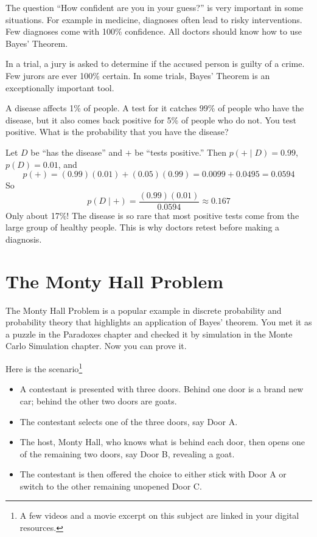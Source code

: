 The question ``How confident are you in your guess?'' is very
important in some situations. For example in medicine, diagnoses often
lead to risky interventions. Few diagnoses come with 100\% confidence.
All doctors should know how to use Bayes' Theorem. 

In a trial, a jury is asked to determine if the accused person is
guilty of a crime. Few jurors are ever 100\% certain. In some trials, Bayes'
Theorem is an exceptionally important tool.

\begin{Exercise}[label=bayes2, title=A Positive Test]
A disease affects 1\% of people. A test for it catches 99\% of people who
have the disease, but it also comes back positive for 5\% of people who do
not. You test positive. What is the probability that you have the
disease?
\end{Exercise}
\begin{Answer}[ref=bayes2]
Let $D$ be ``has the disease'' and $+$ be ``tests positive.'' Then
$p(+ \mid D) = 0.99$, $p(D) = 0.01$, and
$$p(+) = (0.99)(0.01) + (0.05)(0.99) = 0.0099 + 0.0495 = 0.0594$$
So
$$p(D \mid +) = \frac{(0.99)(0.01)}{0.0594} \approx 0.167$$
Only about 17\%! The disease is so rare that most positive tests come from
the large group of healthy people. This is why doctors retest before
making a diagnosis.
\end{Answer}

\section{The Monty Hall Problem}

The Monty Hall Problem is a popular example in discrete probability and probability theory that highlights an application of Bayes' theorem. You met it as a puzzle in the Paradoxes chapter and checked it by simulation in the Monte Carlo Simulation chapter. Now you can prove it. 

Here is the scenario\footnote{A few videos and a movie excerpt on this subject are linked in your digital resources.}
\begin{itemize}
    \item A contestant is presented with three doors. Behind one door is a brand new car; behind the other two doors are goats.
    \item The contestant selects one of the three doors, say Door A.
    \item The host, Monty Hall, who knows what is behind each door, then opens one of the remaining two doors, say Door B, revealing a goat.
    \item The contestant is then offered the choice to either stick with Door A or switch to the other remaining unopened Door C.
\end{itemize}

